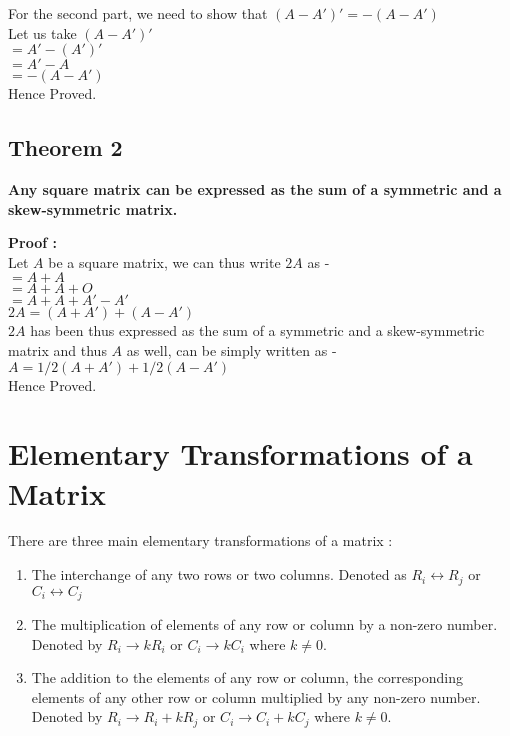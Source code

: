 \documentclass[12pt, letterpaper]{article}
\begin{document}
For the second part, we need to show that $(A - A')' = -(A - A')$\\
Let us take $(A - A')'$\\
$= A' - (A')'$\\
$ = A' - A$\\
$= -(A - A')$\\
Hence Proved.


\subsection{Theorem 2}
\begin{displayquote}
\textbf{Any square matrix can be expressed as the sum of a symmetric and a skew-symmetric matrix.}
\end{displayquote}
\textbf{Proof :}\\
Let $A$ be a square matrix, we can thus write $2A$ as - \\
$= A + A$\\
$= A + A + O$\\
$= A + A + A' - A'$\\
$2A = (A+A') + (A-A')$\\
$2A$ has been thus expressed as the sum of a symmetric and a skew-symmetric matrix and thus $A$ as well, can be simply written as - \\
$ A = 1/2(A+A') + 1/2(A-A')$\\
Hence Proved.

\section{Elementary Transformations of a Matrix}
There are three main elementary transformations of a matrix : 
\begin{enumerate}
    \item The interchange of any two rows or two columns. Denoted as $R_i \leftrightarrow R_j$ or $C_i \leftrightarrow C_j$
    \item The multiplication of elements of any row or column by a non-zero number. Denoted by $R_i \rightarrow kR_i$ or $C_i \rightarrow kC_i$ where $k \neq 0$.
    \item The addition to the elements of any row or column, the corresponding elements of any other row or column multiplied by any non-zero number. Denoted by $R_i \rightarrow R_i + kR_j$ or $C_i \rightarrow C_i + kC_j$ where $k \neq 0$.
\end{enumerate}
\end{document}
